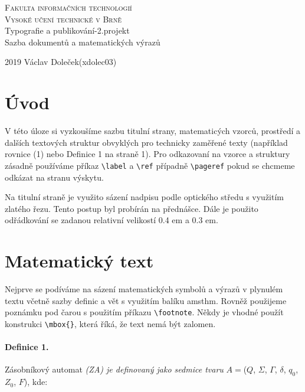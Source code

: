 \documentclass[a4paper,11pt,twocolumn]{article}
\begin{document}
\begin{titlepage}
\begin{center}
    \huge
    \textsc{Fakulta informačních technologií}\\
    \textsc{Vysoké učení technické v Brně}\\
    Typografie a publikování-2.projekt\\
    Sazba dokumentů a matematických výrazů
\end{center}
{\large 2019 \hfill Václav Doleček(xdolec03)}

\end{titlepage}


\section*{Úvod}
V této úloze si vyzkoušíme sazbu titulní strany, matematicých vzorců, prostředí a dalších textových struktur obvyklých pro technicky zaměřené texty (například rovnice (1)
nebo Definice 1 na straně 1). Pro odkazovaní na vzorce
a struktury zásadně používáme příkaz \verb|\label| a \verb|\ref| případně \verb|\pageref| pokud se chcmeme odkázat na stranu výskytu.

Na titulní straně je využito sázení nadpisu podle optického středu s využitím zlatého řezu. Tento postup byl
probírán na přednášce. Dále je použito odřádkování se
zadanou relativní velikostí 0.4 em a 0.3 em.

\section{Matematický text}

Nejprve se podíváme na sázení matematických symbolů
a výrazů v plynulém textu včetně sazby definic a vět s využitím balíku amsthm. Rovněž použijeme poznámku pod
čarou s použitím příkazu \verb|\footnote|. Někdy je vhodné
použít konstrukci \verb|\mbox{}|, která říká, že text nemá být
zalomen.

\paragraph{Definice 1.}
Zásobníkový automat \emph{(ZA) je definovaný jako sedmice tvaru} $A=$($Q$, $\Sigma$, $\Gamma$, $\delta$, $q_0$, $Z_0$, $F$), kde:
\end{document}
